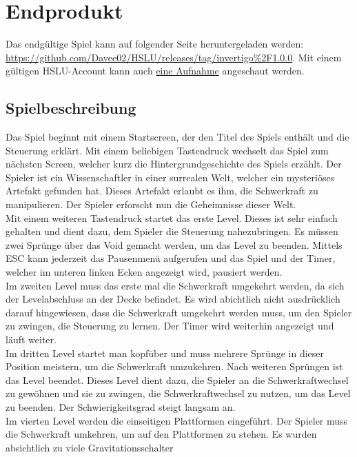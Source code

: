 \documentclass{article}
\begin{document}
\newpage
\section{Endprodukt}

Das endgültige Spiel kann auf folgender Seite heruntergeladen werden: \url{https://github.com/Davee02/HSLU/releases/tag/invertigo%2F1.0.0}.
Mit einem gültigen HSLU-Account kann auch \href{www.todo.ch}{eine Aufnahme}
angeschaut werden.

\subsection{Spielbeschreibung}

Das Spiel beginnt mit einem Startscreen, der den Titel des Spiels enthält und die Steuerung erklärt. Mit einem beliebigen Tastendruck wechselt das Spiel zum nächsten Screen, welcher
kurz die Hintergrundgeschichte des Spiels erzählt. Der Spieler ist ein Wissenschaftler in einer surrealen Welt, welcher ein mysteriöses Artefakt gefunden hat. Dieses Artefakt erlaubt
es ihm, die Schwerkraft zu manipulieren. Der Spieler erforscht nun die Geheimnisse dieser Welt.
\\
Mit einem weiteren Tastendruck startet das erste Level. Dieses ist sehr einfach gehalten und dient dazu, dem Spieler die Steuerung nahezubringen. Es müssen zwei Sprünge über das Void
gemacht werden, um das Level zu beenden. Mittels ESC kann jederzeit das Pausenmenü aufgerufen und das Spiel und der Timer, welcher im unteren linken Ecken angezeigt wird, pausiert werden.
\\
Im zweiten Level muss das erste mal die Schwerkraft umgekehrt werden, da sich der Levelabschluss an der Decke befindet. Es wird abichtlich nicht ausdrücklich darauf hingewiesen, dass die
Schwerkraft umgekehrt werden muss, um den Spieler zu zwingen, die Steuerung zu lernen. Der Timer wird weiterhin angezeigt und läuft weiter.
\\
Im dritten Level startet man kopfüber und muss mehrere Sprünge in dieser Position meistern, um die Schwerkraft umzukehren. Nach weiteren Sprüngen ist das Level beendet. Dieses Level
dient dazu, die Spieler an die Schwerkraftwechsel zu gewöhnen und sie zu zwingen, die Schwerkraftwechsel zu nutzen, um das Level zu beenden. Der Schwierigkeitsgrad steigt langsam an.
\\
Im vierten Level werden die einseitigen Plattformen eingeführt. Der Spieler muss die Schwerkraft umkehren, um auf den Plattformen zu stehen. Es wurden absichtlich zu viele Gravitationsschalter 
\end{document}
